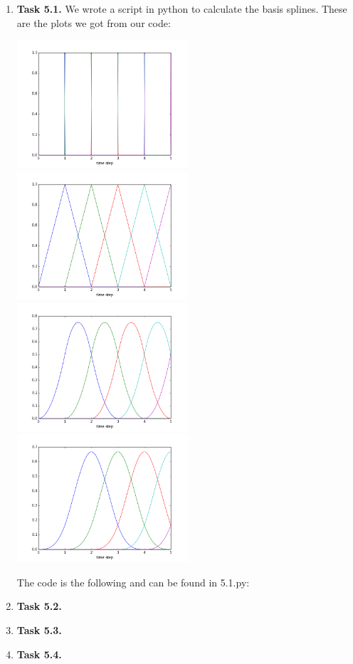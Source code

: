 \documentclass[a4paper,11pt]{article}
\author{\authorinfo}
\title{\titleinfo}
\date{\today}
\begin{document}
\maketitle
\begin {enumerate}
	\item[\textbf{Task 5.1.}]
		We wrote a script in python to calculate the basis splines. These are the plots we got from our code:
		
		\includegraphics[width=0.5\textwidth]{5-1-k=1}
		\includegraphics[width=0.5\textwidth]{5-1-k=2}
		\includegraphics[width=0.5\textwidth]{5-1-k=3}
		\includegraphics[width=0.5\textwidth]{5-1-k=4}
		
		The code is the following and can be found in 5.1.py:
		
		
		
	\item[\textbf{Task 5.2.}]
		
	\item[\textbf{Task 5.3.}]
		
	\item[\textbf{Task 5.4.}]
		
		
		
\end {enumerate}
\end{document}
